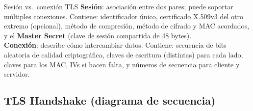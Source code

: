 \documentclass[11pt,a4paper]{article}
\begin{document}
\begin{defbox}{Sesión vs.\ conexión TLS}
\textbf{Sesión}: asociación entre dos pares; puede soportar múltiples conexiones. Contiene:
identificador único, certificado X.509v3 del otro extremo (opcional), método de compresión,
método de cifrado y MAC acordados, y el \textbf{Master Secret} (clave de sesión compartida de
48 bytes).\\[3pt]
\textbf{Conexión}: describe cómo intercambiar datos. Contiene: secuencia de bits aleatoria de
calidad criptográfica, claves de escritura (distintas) para cada lado, claves para los MAC,
IVs si hacen falta, y números de secuencia para cliente y servidor.
\end{defbox}

\subsection{TLS Handshake (diagrama de secuencia)}
\end{document}
